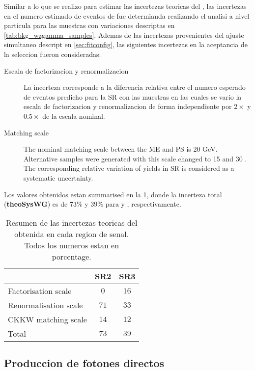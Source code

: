 Similar a lo que se realizo para estimar las incertezas teoricas del {\ttgam}, las incertezas
en el numero estimado de eventos de {\wgam} fue determianda realizando el analisi a nivel
particula para las muestras con variaciones descriptas en {\tab} \ref{tab:bkg_wzgamma_samples}.
Ademas de las incertezas provenientes del ajuste simultaneo descript en {\Sec} \ref{sec:fitconfig},
las siguientes incertezas en la aceptancia de la seleccion fueron consideradas:

\begin{description}
\item[Escala de factorizacion y renormalizacion] La incerteza corresponde
  a la diferencia relativa entre el numero esperado de eventos predicho
  para la SR con las muestras {\sherpa} en las cuales se vario la escala
  de factorizacion y renormalizacion de forma independiente por $2\times$
  y $0.5\times$ de la escala nominal.

\item[Matching scale] The nominal matching scale between the ME and PS is 20 GeV. Alternative samples
  were generated with this scale changed to 15 and 30 \gev. The corresponding
  relative variation of yields in SR is considered as a systematic uncertainty.
\end{description}

Los valores obtenidos estan summarised en la {\tab} \ref{tab:syst_wgamma_truth},
donde la incerteza total ({\bf theoSysWG}) es de  $73$\% y $39$\% para {\SRL} y
{\SRH}, respectivamente.

\begin{table}[ht!]
  \centering
  \begin{tabular}{ l | c  c  }
    \hline
    & SR2 & SR3 \\
    \hline
    Factorisation scale   & $0$  & $16$ \\
    Renormalisation scale & $71$ & $33$ \\
    CKKW matching scale   & $14$ & $12$ \\
    \hline
    \hline
    Total  &   $73$    &  $39$     \\
    \hline
  \end{tabular}
  \caption{Resumen de las incertezas teoricas del {\wgam} obtenida en cada region de senal.
    Todos los numeros estan en porcentage.}
  \label{tab:syst_wgamma_truth}
\end{table}



\subsection{Produccion de fotones directos}

